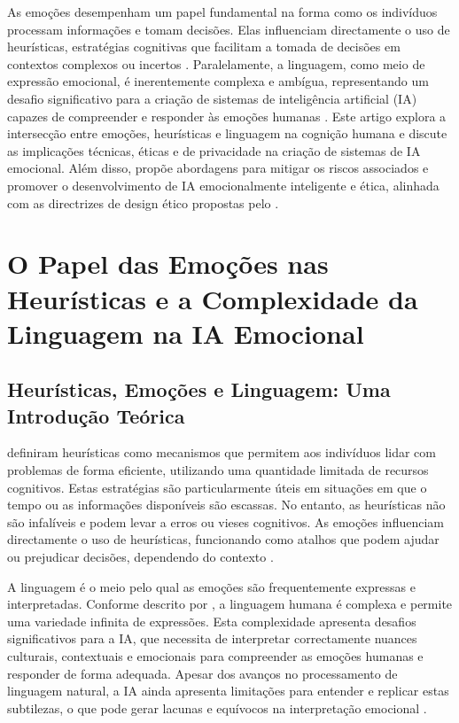 \documentclass[a4paper,12pt]{report}
\begin{document}
	As emoções desempenham um papel fundamental na forma como os indivíduos processam informações e tomam decisões. Elas influenciam directamente o uso de heurísticas, estratégias cognitivas que facilitam a tomada de decisões em contextos complexos ou incertos \parencite{kahneman1974}. Paralelamente, a linguagem, como meio de expressão emocional, é inerentemente complexa e ambígua, representando um desafio significativo para a criação de sistemas de inteligência artificial (IA) capazes de compreender e responder às emoções humanas \parencite{chomsky1965}. Este artigo explora a intersecção entre emoções, heurísticas e linguagem na cognição humana e discute as implicações técnicas, éticas e de privacidade na criação de sistemas de IA emocional. Além disso, propõe abordagens para mitigar os riscos associados e promover o desenvolvimento de IA emocionalmente inteligente e ética, alinhada com as directrizes de design ético propostas pelo \textcite{ieee2019}.

	\section{O Papel das Emoções nas Heurísticas e a Complexidade da Linguagem na IA Emocional}
	
	\subsection{Heurísticas, Emoções e Linguagem: Uma Introdução Teórica}
	
	\textcite{kahneman1974} definiram heurísticas como mecanismos que permitem aos indivíduos lidar com problemas de forma eficiente, utilizando uma quantidade limitada de recursos cognitivos. Estas estratégias são particularmente úteis em situações em que o tempo ou as informações disponíveis são escassas. No entanto, as heurísticas não são infalíveis e podem levar a erros ou vieses cognitivos. As emoções influenciam directamente o uso de heurísticas, funcionando como atalhos que podem ajudar ou prejudicar decisões, dependendo do contexto \parencite{slovic2007}.
	
	A linguagem é o meio pelo qual as emoções são frequentemente expressas e interpretadas. Conforme descrito por \textcite{chomsky1965}, a linguagem humana é complexa e permite uma variedade infinita de expressões. Esta complexidade apresenta desafios significativos para a IA, que necessita de interpretar correctamente nuances culturais, contextuais e emocionais para compreender as emoções humanas e responder de forma adequada. Apesar dos avanços no processamento de linguagem natural, a IA ainda apresenta limitações para entender e replicar estas subtilezas, o que pode gerar lacunas e equívocos na interpretação emocional \parencite{russell2020}.
	
\end{document}
